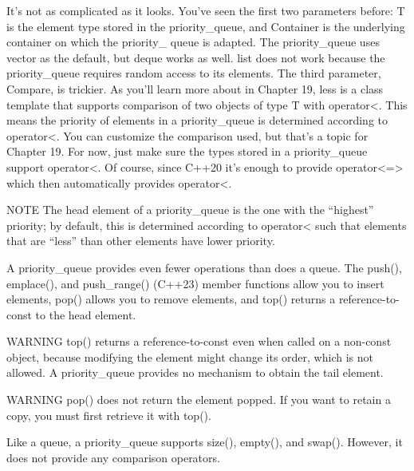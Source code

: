 It’s not as complicated as it looks. You’ve seen the first two parameters before: T is the element type stored in the priority\_queue, and Container is the underlying container on which the priority\_ queue is adapted. The priority\_queue uses vector as the default, but deque works as well. list does not work because the priority\_queue requires random access to its elements. The third parameter, Compare, is trickier. As you’ll learn more about in Chapter 19, less is a class template that supports comparison of two objects of type T with operator<. This means the priority of elements in a priority\_queue is determined according to operator<. You can customize the comparison used, but that’s a topic for Chapter 19. For now, just make sure the types stored in a priority\_queue support operator<. Of course, since C++20 it’s enough to provide operator<=> which then automatically provides operator<.

\begin{myNotic}{NOTE}
The head element of a priority\_queue is the one with the “highest” priority; by default, this is determined according to operator< such that elements that are “less” than other elements have lower priority.
\end{myNotic}


A priority\_queue provides even fewer operations than does a queue. The push(), emplace(), and push\_range() (C++23) member functions allow you to insert elements, pop() allows you to remove elements, and top() returns a reference-to-const to the head element.

\begin{myWarning}{WARNING}
top() returns a reference-to-const even when called on a non-const object, because modifying the element might change its order, which is not allowed.  A priority\_queue provides no mechanism to obtain the tail element.
\end{myWarning}

\begin{myWarning}{WARNING}
pop() does not return the element popped. If you want to retain a copy, you must first retrieve it with top().
\end{myWarning}

Like a queue, a priority\_queue supports size(), empty(), and swap(). However, it does not provide any comparison operators.


